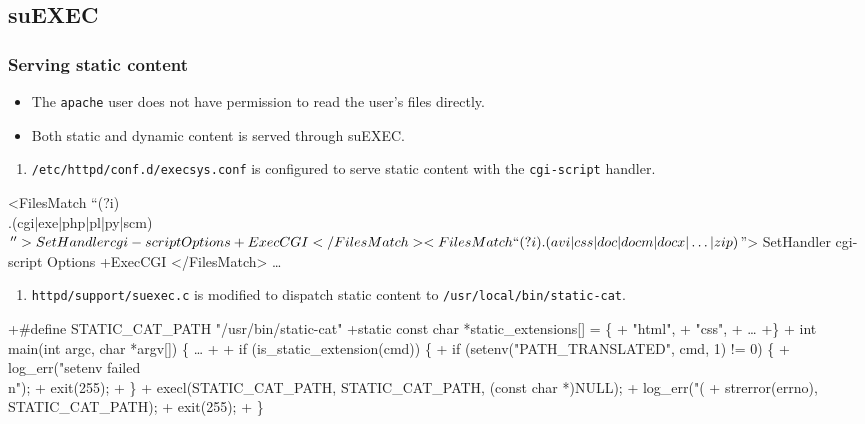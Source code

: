 \subsection{suEXEC}

\begin{frame}
  \frametitle{Serving static content}
  \begin{itemize}
  \item The \texttt{apache} user does not have permission to read the
    user's files directly.
  \item Both static and dynamic content is served through suEXEC.
  \end{itemize}
\end{frame}

\begin{frame}[fragile,t]
  \begin{enumerate}
  \item \texttt{/etc/httpd/conf.d/execsys.conf} is configured to serve
    static content with the \texttt{cgi-script} handler.
  \end{enumerate}
\begin{footnotesize}
\begin{semiverbatim}
<FilesMatch ``(?i)\\.(cgi|exe|php|pl|py|scm)$''>
        SetHandler cgi-script
        Options +ExecCGI
</FilesMatch>
<FilesMatch ``(?i)\\.(avi|css|doc|docm|docx|\ldots|zip)$''>
        SetHandler cgi-script
        Options +ExecCGI
</FilesMatch>
\ldots
\end{semiverbatim}
\end{footnotesize}
\end{frame}

\begin{frame}[fragile,t]
  \begin{enumerate}
    \addtocounter{enumi}{2}
  \item \texttt{httpd/support/suexec.c} is modified to dispatch static
    content to \texttt{/usr/local/bin/static-cat}.
  \end{enumerate}
\begin{footnotesize}
\begin{semiverbatim}
+#define STATIC_CAT_PATH "/usr/bin/static-cat"
+static const char *static_extensions[] = \{
+    "html",
+    "css",
+    \ldots
+\}
+
 int main(int argc, char *argv[])
 \{ \ldots
+
+    if (is_static_extension(cmd)) \{
+        if (setenv("PATH_TRANSLATED", cmd, 1) != 0) \{
+            log_err("setenv failed\\n");
+            exit(255);
+        \}
+        execl(STATIC_CAT_PATH, STATIC_CAT_PATH, (const char *)NULL);
+        log_err("(%
+                strerror(errno), STATIC_CAT_PATH);
+        exit(255);
+    \}
\end{semiverbatim}
\end{footnotesize}
\end{frame}

